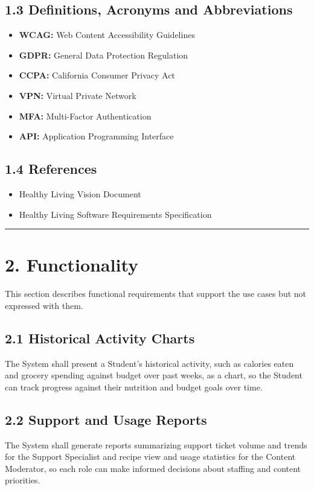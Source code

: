 \documentclass[10pt,letterpaper]{article}
\newcommand{\ucseparator}{\vspace{1em}\noindent\rule{\linewidth}{0.4pt}\vspace{1.5em}}
\begin{document}
\subsection*{1.3 Definitions, Acronyms and Abbreviations}
\begin{itemize}
    \item \textbf{WCAG:} Web Content Accessibility Guidelines
    \item \textbf{GDPR:} General Data Protection Regulation
    \item \textbf{CCPA:} California Consumer Privacy Act
    \item \textbf{VPN:} Virtual Private Network
    \item \textbf{MFA:} Multi-Factor Authentication
    \item \textbf{API:} Application Programming Interface
\end{itemize}

\subsection*{1.4 References}
\begin{itemize}
    \item Healthy Living Vision Document
    \item Healthy Living Software Requirements Specification
\end{itemize}

\ucseparator

\section*{2. Functionality}

This section describes functional requirements that support the use cases but not expressed with them.

\subsection*{2.1 Historical Activity Charts}
The System shall present a Student's historical activity, such as calories eaten and grocery spending against budget over past weeks, as a chart, so the Student can track progress against their nutrition and budget goals over time.

\subsection*{2.2 Support and Usage Reports}
The System shall generate reports summarizing support ticket volume and trends for the Support Specialist and recipe view and usage statistics for the Content Moderator, so each role can make informed decisions about staffing and content priorities.
\end{document}
